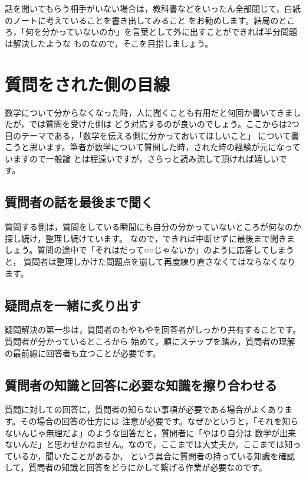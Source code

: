 \documentclass[./main]{subfiles}
\begin{document}
話を聞いてもらう相手がいない場合は，教科書などをいったん全部閉じて，白紙のノートに考えていることを書き出してみること
をお勧めします。結局のところ，「何を分かっていないのか」を言葉として外に出すことができれば半分問題は解決したような
ものなので，そこを目指しましょう。

\section{質問をされた側の目線}

数学について分からなくなった時，人に聞くことも有用だと何回か書いてきましたが，では質問を受けた側は
どう対応するのが良いのでしょう。ここからは2つ目のテーマである，「数学を伝える側に分かっておいてほしいこと」
について書こうと思います。筆者が数学について質問した時，された時の経験が元になっていますので一般論
とは程遠いですが，さらっと読み流して頂ければ嬉しいです。

\subsection{質問者の話を最後まで聞く}

質問する側は，質問をしている瞬間にも自分の分かっていないところが何なのか探し続け，整理し続けています。
なので，できれば中断せずに最後まで聞きましょう。質問の途中で「それはだって○○じゃないか」のように応答してしまうと，
質問者は整理しかけた問題点を崩して再度練り直さなくてはならなくなります。

\subsection{疑問点を一緒に炙り出す}

疑問解決の第一歩は，質問者のもやもやを回答者がしっかり共有することです。質問者が分かっているところから
始めて，順にステップを踏み，質問者の理解の最前線に回答者も立つことが必要です。

\subsection{質問者の知識と回答に必要な知識を擦り合わせる}

質問に対しての回答に，質問者の知らない事項が必要である場合がよくあります。その場合の回答の仕方には
注意が必要です。なぜかというと，「それを知らないんじゃ無理だよ」のような回答だと，質問者に「やはり自分は
数学が出来ないんだ」と思わせかねません。なので，ここまでは大丈夫か，ここまでは知っているか，聞いたことがあるか，
という具合に質問者の持っている知識を確認して，質問者の知識と回答をどうにかして繋げる作業が必要なのです。
\end{document}
